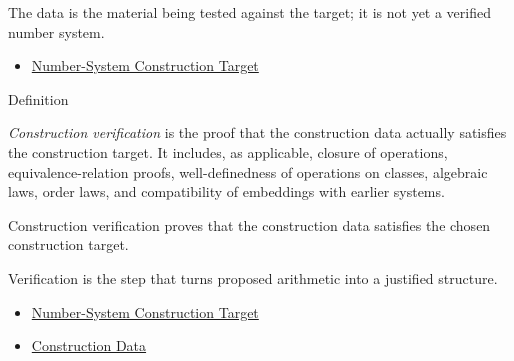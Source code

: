\begin{remark*}[Interpretation]
The data is the material being tested against the target; it is not yet a
verified number system.
\end{remark*}

\begin{dependencies}
\begin{itemize}
  \item \hyperref[def:number-system-construction-target]{Number-System Construction Target}
\end{itemize}
\end{dependencies}

\begin{definitionbox}{Definition}
\begin{definition}
\label{def:number-system-construction-verification}
\emph{Construction verification} is the proof that the construction data
actually satisfies the construction target. It includes, as applicable,
closure of operations, equivalence-relation proofs, well-definedness of
operations on classes, algebraic laws, order laws, and compatibility of
embeddings with earlier systems.
\end{definition}
\end{definitionbox}

\begin{remark*}
Construction verification proves that the construction data satisfies the
chosen construction target.
\end{remark*}

\begin{remark*}[Interpretation]
Verification is the step that turns proposed arithmetic into a justified
structure.
\end{remark*}

\begin{dependencies}
\begin{itemize}
  \item \hyperref[def:number-system-construction-target]{Number-System Construction Target}
  \item \hyperref[def:number-system-construction-data]{Construction Data}
\end{itemize}
\end{dependencies}
